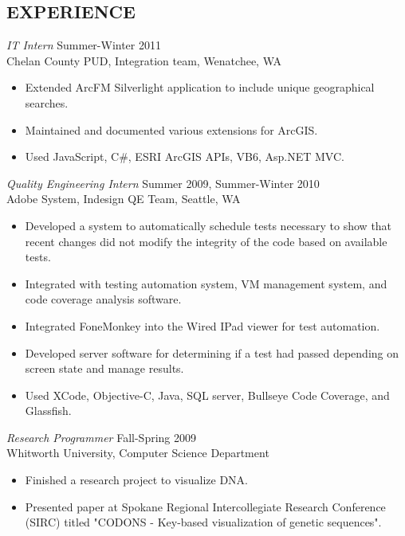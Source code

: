 \documentclass[line]{res}
\begin{document}
\begin{resume}
\section{EXPERIENCE} 
 				{\sl IT Intern} \hfill Summer-Winter 2011\\
				Chelan County PUD, Integration team, Wenatchee, WA
                 \begin{itemize}  \itemsep -2pt %
					 \item Extended	ArcFM Silverlight application to include unique geographical searches.
					 \item Maintained and documented various extensions for ArcGIS.
					 \item Used JavaScript, C\#, ESRI ArcGIS APIs, VB6, Asp.NET MVC.
				 \end{itemize}
				 
				{\sl Quality Engineering Intern} \hfill Summer 2009, Summer-Winter 2010 \\
                Adobe System, Indesign QE Team, Seattle, WA
                 \begin{itemize}  \itemsep -2pt %
	                 \item Developed a system to automatically schedule tests necessary to show that recent changes did not modify the integrity of the code based on available tests.
	                \item Integrated with testing automation system, VM management system, and code coverage analysis software.
	                 \item Integrated FoneMonkey into the Wired IPad viewer for test automation.
	                 \item Developed server software for determining if a test had passed depending on screen state and manage results.
	                 \item Used XCode, Objective-C, Java, SQL server, Bullseye Code Coverage, and Glassfish.
 				 \end{itemize}
 								 
                {\sl Research Programmer} \hfill             Fall-Spring 2009 \\
                Whitworth University, Computer Science Department
                 \begin{itemize}  \itemsep -2pt %
	                 \item Finished a research project to visualize DNA.
	                 \item Presented paper at Spokane Regional Intercollegiate Research Conference (SIRC) titled "CODONS - Key-based visualization of genetic sequences".
                 \end{itemize} 				
                 				

\end{resume}
\end{document}
